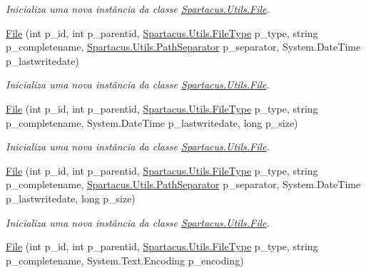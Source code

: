 \begin{DoxyCompactItemize}
\begin{DoxyCompactList}\small\item\em Inicializa uma nova instância da classe \hyperlink{classSpartacus_1_1Utils_1_1File}{Spartacus.\+Utils.\+File}. \end{DoxyCompactList}\item 
\hyperlink{classSpartacus_1_1Utils_1_1File_a6414d1f5579afb2436b4566e8a8dd634}{File} (int p\+\_\+id, int p\+\_\+parentid, \hyperlink{namespaceSpartacus_1_1Utils_a2bc44488e88db523cb2dcffaa6e77541}{Spartacus.\+Utils.\+File\+Type} p\+\_\+type, string p\+\_\+completename, \hyperlink{namespaceSpartacus_1_1Utils_a9ee24558a33d60b42674bae3eed2a094}{Spartacus.\+Utils.\+Path\+Separator} p\+\_\+separator, System.\+Date\+Time p\+\_\+lastwritedate)
\begin{DoxyCompactList}\small\item\em Inicializa uma nova instância da classe \hyperlink{classSpartacus_1_1Utils_1_1File}{Spartacus.\+Utils.\+File}. \end{DoxyCompactList}\item 
\hyperlink{classSpartacus_1_1Utils_1_1File_a3514b9b2a282cf37669ee33a72b85ce5}{File} (int p\+\_\+id, int p\+\_\+parentid, \hyperlink{namespaceSpartacus_1_1Utils_a2bc44488e88db523cb2dcffaa6e77541}{Spartacus.\+Utils.\+File\+Type} p\+\_\+type, string p\+\_\+completename, System.\+Date\+Time p\+\_\+lastwritedate, long p\+\_\+size)
\begin{DoxyCompactList}\small\item\em Inicializa uma nova instância da classe \hyperlink{classSpartacus_1_1Utils_1_1File}{Spartacus.\+Utils.\+File}. \end{DoxyCompactList}\item 
\hyperlink{classSpartacus_1_1Utils_1_1File_a254e0fcae9f7cec190648b846cd18e31}{File} (int p\+\_\+id, int p\+\_\+parentid, \hyperlink{namespaceSpartacus_1_1Utils_a2bc44488e88db523cb2dcffaa6e77541}{Spartacus.\+Utils.\+File\+Type} p\+\_\+type, string p\+\_\+completename, \hyperlink{namespaceSpartacus_1_1Utils_a9ee24558a33d60b42674bae3eed2a094}{Spartacus.\+Utils.\+Path\+Separator} p\+\_\+separator, System.\+Date\+Time p\+\_\+lastwritedate, long p\+\_\+size)
\begin{DoxyCompactList}\small\item\em Inicializa uma nova instância da classe \hyperlink{classSpartacus_1_1Utils_1_1File}{Spartacus.\+Utils.\+File}. \end{DoxyCompactList}\item 
\hyperlink{classSpartacus_1_1Utils_1_1File_a44ad56775a4dea0b798980e64027057a}{File} (int p\+\_\+id, int p\+\_\+parentid, \hyperlink{namespaceSpartacus_1_1Utils_a2bc44488e88db523cb2dcffaa6e77541}{Spartacus.\+Utils.\+File\+Type} p\+\_\+type, string p\+\_\+completename, System.\+Text.\+Encoding p\+\_\+encoding)

\end{DoxyCompactItemize}
